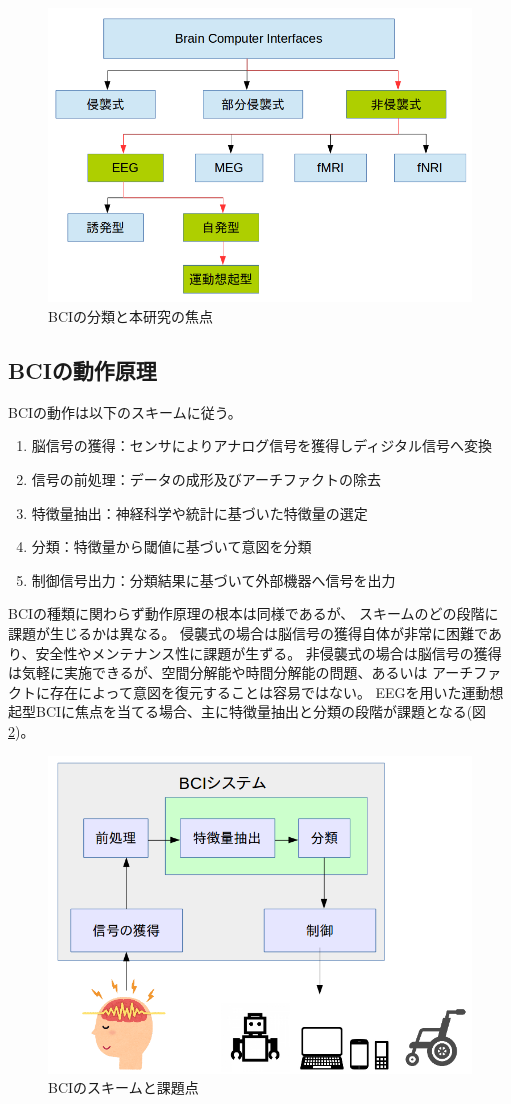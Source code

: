 \begin{figure}[tb]
    \centering
    \includegraphics[width=14cm]{images/BCIclass.png}
    \caption{BCIの分類と本研究の焦点}
    \label{fig:BCIclass}
\end{figure}

\subsection{BCIの動作原理}
BCIの動作は以下のスキームに従う。
\begin{enumerate}
    \item 脳信号の獲得：センサによりアナログ信号を獲得しディジタル信号へ変換
    \item 信号の前処理：データの成形及びアーチファクトの除去
    \item 特徴量抽出：神経科学や統計に基づいた特徴量の選定
    \item 分類：特徴量から閾値に基づいて意図を分類
    \item 制御信号出力：分類結果に基づいて外部機器へ信号を出力
\end{enumerate}
BCIの種類に関わらず動作原理の根本は同様であるが、
スキームのどの段階に課題が生じるかは異なる。
侵襲式の場合は脳信号の獲得自体が非常に困難であり、安全性やメンテナンス性に課題が生ずる。
非侵襲式の場合は脳信号の獲得は気軽に実施できるが、空間分解能や時間分解能の問題、あるいは
アーチファクトに存在によって意図を復元することは容易ではない。
EEGを用いた運動想起型BCIに焦点を当てる場合、主に特徴量抽出と分類の段階が課題となる(図\ref{fig:BCIsystem})。

\begin{figure}[tb]
    \centering
    \includegraphics[width=14cm]{images/BCIsystem.png}
    \caption{BCIのスキームと課題点}
    \label{fig:BCIsystem}
\end{figure}